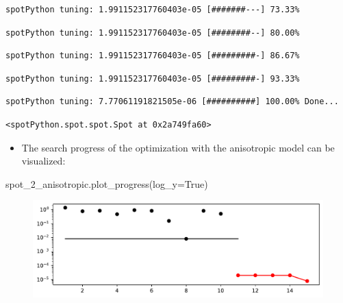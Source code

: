 \documentclass[
  letterpaper,
  DIV=11,
  numbers=noendperiod]{scrreprt}
\newenvironment{Shaded}{\begin{snugshade}}{\end{snugshade}}
\newcommand{\NormalTok}[1]{\textcolor[rgb]{0.00,0.23,0.31}{#1}}
\newcommand{\OperatorTok}[1]{\textcolor[rgb]{0.37,0.37,0.37}{#1}}
\newcommand{\VariableTok}[1]{\textcolor[rgb]{0.07,0.07,0.07}{#1}}
\providecommand{\tightlist}{%
  \setlength{\itemsep}{0pt}\setlength{\parskip}{0pt}}\usepackage{longtable,booktabs,array}
\begin{document}
\begin{verbatim}
spotPython tuning: 1.991152317760403e-05 [#######---] 73.33% 
\end{verbatim}

\begin{verbatim}
spotPython tuning: 1.991152317760403e-05 [########--] 80.00% 
\end{verbatim}

\begin{verbatim}
spotPython tuning: 1.991152317760403e-05 [#########-] 86.67% 
\end{verbatim}

\begin{verbatim}
spotPython tuning: 1.991152317760403e-05 [#########-] 93.33% 
\end{verbatim}

\begin{verbatim}
spotPython tuning: 7.77061191821505e-06 [##########] 100.00% Done...
\end{verbatim}

\begin{verbatim}
<spotPython.spot.spot.Spot at 0x2a749fa60>
\end{verbatim}

\begin{itemize}
\tightlist
\item
  The search progress of the optimization with the anisotropic model can
  be visualized:
\end{itemize}

\begin{Shaded}
\begin{Highlighting}[]
\NormalTok{spot\_2\_anisotropic.plot\_progress(log\_y}\OperatorTok{=}\VariableTok{True}\NormalTok{)}
\end{Highlighting}
\end{Shaded}

\begin{figure}[H]

{\centering \includegraphics{03_spot_anisotropic_files/figure-pdf/cell-9-output-1.pdf}

}

\end{figure}
\end{document}
